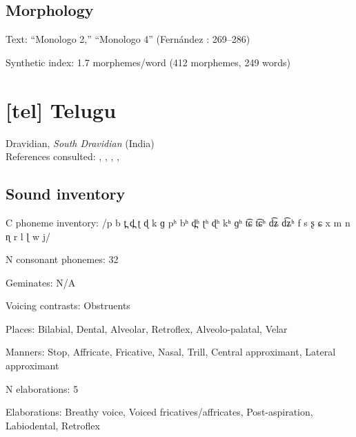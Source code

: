 {\subsection*{Morphology}

\begin{appendixdesc}

\item[Text:] “Monologo 2,” “Monologo 4” (Fernández \citealt{GarayHernández2006}: 269--286)

\item[Synthetic index:] 1.7 morphemes/word (412 morphemes, 249 words)
\end{appendixdesc}

\section*{[tel] Telugu}  %
Dravidian, \textit{South Dravidian} (India)\medskip\\
References consulted: \citet{BhaskararaoRay2017}, \citet{Kelley1963}, \citet{Kostićetal1977}, \citet{Krishnamurti1998}, \citet{Sailaja1999}

\subsection*{Sound inventory}
\begin{appendixdesc}

\item[C phoneme inventory:] /p b t̪ d̪ ʈ ɖ k ɡ pʰ bʰ d̪ʰ ʈʰ ɖʰ kʰ ɡʰ t͡ɕ t͡ɕʰ d͡ʑ d͡ʑʰ f s ʂ ɕ x m n ɳ r l ɭ w j/

\item[N consonant phonemes:] 32

\item[Geminates:] N/A

\item[Voicing contrasts:] Obstruents

\item[Places:] Bilabial, Dental, Alveolar, Retroflex, Alveolo-palatal, Velar

\item[Manners:] Stop, Affricate, Fricative, Nasal, Trill, Central approximant, Lateral approximant

\item[N elaborations:] 5

\item[Elaborations:] Breathy voice, Voiced fricatives/affricates, Post-aspiration, Labiodental, Retroflex


\end{appendixdesc}}
